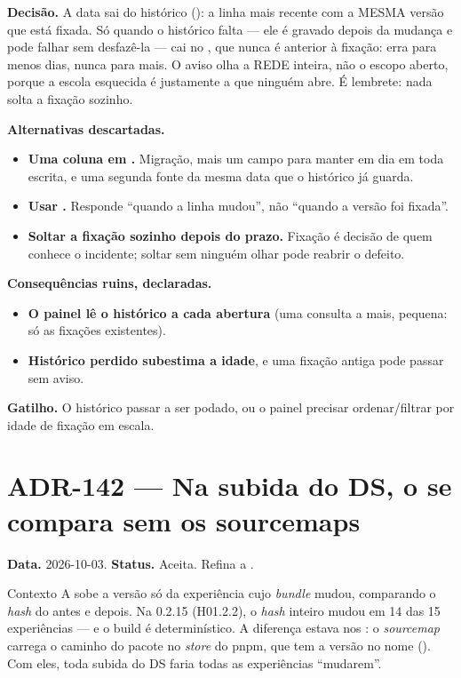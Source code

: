 \textbf{Decisão.} A data sai do histórico (): a linha
 mais recente com a MESMA versão que está fixada. Só quando o
histórico falta --- ele é gravado depois da mudança e pode falhar sem
desfazê-la --- cai no , que nunca é anterior à fixação: erra
para menos dias, nunca para mais. O aviso olha a REDE inteira, não o escopo
aberto, porque a escola esquecida é justamente a que ninguém abre. É lembrete:
nada solta a fixação sozinho.

\textbf{Alternativas descartadas.}

\begin{itemize}
  \item \textbf{Uma coluna  em .} Migração,
    mais um campo para manter em dia em toda escrita, e uma segunda fonte da
    mesma data que o histórico já guarda.
  \item \textbf{Usar .} Responde \enquote{quando a linha mudou},
    não \enquote{quando a versão foi fixada}.
  \item \textbf{Soltar a fixação sozinho depois do prazo.} Fixação é decisão de
    quem conhece o incidente; soltar sem ninguém olhar pode reabrir o defeito.
\end{itemize}

\textbf{Consequências ruins, declaradas.}

\begin{itemize}
  \item \textbf{O painel lê o histórico a cada abertura} (uma consulta a mais,
    pequena: só as fixações existentes).
  \item \textbf{Histórico perdido subestima a idade}, e uma fixação antiga pode
    passar sem aviso.
\end{itemize}

\textbf{Gatilho.} O histórico passar a ser podado, ou o painel precisar
ordenar/filtrar por idade de fixação em escala.

\section{ADR-142 --- Na subida do DS, o \texorpdfstring{}{dist/} se compara sem os sourcemaps}
\label{adr:ds-dist-sem-map}

\textbf{Data.} 2026-10-03. \textbf{Status.} Aceita. Refina a .

\begin{especificacao}{Contexto}
A  sobe a versão só da experiência cujo \emph{bundle} mudou,
comparando o \emph{hash} do  antes e depois. Na 0.2.15 (H01.2.2), o
\emph{hash} inteiro mudou em 14 das 15 experiências --- e o build é
determinístico. A diferença estava nos : o \emph{sourcemap} carrega o
caminho do pacote no \emph{store} do pnpm, que tem a versão no nome
(). Com eles, toda subida do DS faria todas as
experiências \enquote{mudarem}.
\end{especificacao}

